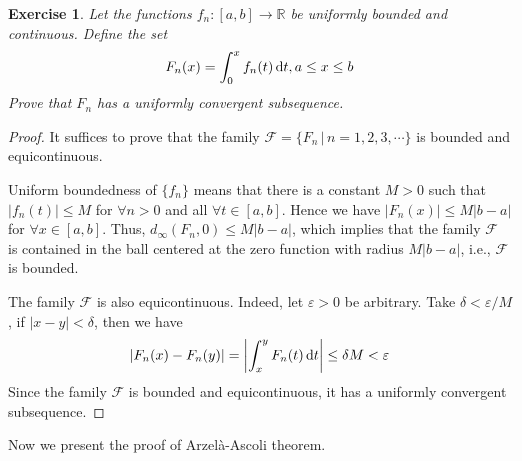 \documentclass[12pt,leqno]{amsart}
\newtheorem{exercise}{Exercise}[section]
\theoremstyle{definition}
\numberwithin{equation}{subsection}
\begin{document}
\medskip

\begin{exercise}
Let the functions $f_n:[a,b]\to\mathbb{R}$ be uniformly bounded and continuous. Define the set 
\begin{align*}
    F_n(x) = \int^x_0 f_n(t)\, {\rm d}t, a\leq x\leq b
\end{align*}
Prove that $F_n$ has a uniformly convergent subsequence.
\end{exercise}
\begin{proof}
It suffices to prove that the family $\mathcal{F} = \{F_n \,|\, n = 1,2,3,\cdots\}$ is bounded and equicontinuous. 

Uniform boundedness of $\{f_n\}$ means that there is a constant $M > 0$ such that $|f_n(t)|\leq M$ for $\forall n > 0$ and all $\forall t\in[a,b]$. Hence we have $|F_n(x)|\leq M|b-a|$ for $\forall x\in[a,b]$. Thus, $d_\infty(F_n, 0)\leq M|b-a|$, which implies that the family $\mathcal{F}$ is contained in the ball centered at the zero function with radius $M|b-a|$, i.e., $\mathcal{F}$ is bounded. 

The family $\mathcal{F}$ is also equicontinuous. Indeed, let $\varepsilon > 0$ be arbitrary. Take $\delta < \varepsilon/M$, if $|x - y| < \delta$, then we have 
\begin{align*}
    \left|F_n(x) - F_n(y)\right| = \left|\int^y_x F_n(t)\, {\rm d}t \right| \leq \delta M < \varepsilon
\end{align*}
Since the family $\mathcal{F}$ is bounded and equicontinuous, it has a uniformly convergent subsequence.
\end{proof}

\medskip

Now we present the proof of Arzelà-Ascoli theorem.
\end{document}

